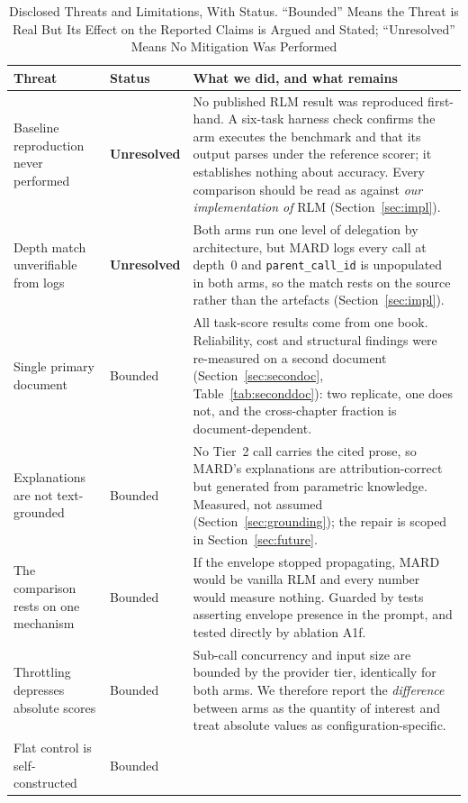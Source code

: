 \documentclass[conference]{IEEEtran}
\begin{document}
\begin{table}[!t]
\caption{Disclosed Threats and Limitations, With Status. ``Bounded'' Means the
Threat is Real But Its Effect on the Reported Claims is Argued and Stated;
``Unresolved'' Means No Mitigation Was Performed}
\label{tab:threats}
\centering
\renewcommand{\arraystretch}{1.25}
\begin{tabular}{@{}p{4.3cm}p{2.05cm}p{9.4cm}@{}}
\toprule
\textbf{Threat} & \textbf{Status} & \textbf{What we did, and what remains} \\
\midrule
Baseline reproduction never performed & \textbf{Unresolved} &
No published RLM result was reproduced first-hand. A six-task harness check
confirms the arm executes the benchmark and that its output parses under the
reference scorer; it establishes nothing about accuracy. Every comparison
should be read as against \emph{our implementation of} RLM
(Section~\ref{sec:impl}). \\
Depth match unverifiable from logs & \textbf{Unresolved} &
Both arms run one level of delegation by architecture, but MARD logs every
call at depth~0 and \texttt{parent\_call\_id} is unpopulated in both arms, so
the match rests on the source rather than the artefacts
(Section~\ref{sec:impl}). \\
\midrule
Single primary document & Bounded &
All task-score results come from one book. Reliability, cost and structural
findings were re-measured on a second document
(Section~\ref{sec:secondoc}, Table~\ref{tab:seconddoc}): two replicate, one
does not, and the cross-chapter fraction is document-dependent. \\
Explanations are not text-grounded & Bounded &
No Tier~2 call carries the cited prose, so MARD's explanations are
attribution-correct but generated from parametric knowledge. Measured, not
assumed (Section~\ref{sec:grounding}); the repair is scoped in
Section~\ref{sec:future}. \\
The comparison rests on one mechanism & Bounded &
If the envelope stopped propagating, MARD would be vanilla RLM and every
number would measure nothing. Guarded by tests asserting envelope presence in
the prompt, and tested directly by ablation A1f. \\
Throttling depresses absolute scores & Bounded &
Sub-call concurrency and input size are bounded by the provider tier,
identically for both arms. We therefore report the \emph{difference} between
arms as the quantity of interest and treat absolute values as
configuration-specific. \\
Flat control is self-constructed & Bounded &

\end{tabular}
\end{table}
\end{document}
